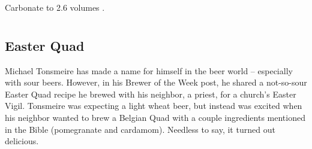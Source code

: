 \documentclass[10pt,oneside]{scrbook}
\begin{document}
\begin{methodandtiming}
 
\begin{mashsteps}
\end{mashsteps}

\begin{fermentationsteps}
\end{fermentationsteps}

\begin{directions}
Carbonate to 2.6 volumes .
\end{directions}

\end{methodandtiming}

\pagebreak

\begin{ingredientsblock}

\begin{malts}
\end{malts}

\begin{hops}
\end{hops}

\begin{yeasts}
\end{yeasts}

\end{ingredientsblock}

\part{\stylebelgiandarkstrongale}

\chapter*{Easter Quad}

\begin{aboutblock}
Michael Tonsmeire has made a name for himself in the beer world -- especially
with sour beers. However, in his Brewer of the Week post, he shared a not-so-sour
Easter Quad recipe he brewed with his neighbor, a priest, for a church's Easter Vigil.
Tonsmeire was expecting a light wheat beer, but instead was excited when his neighbor
wanted to brew a Belgian Quad with a couple ingredients mentioned in the Bible
(pomegranate and cardamom). Needless to say, it turned out delicious.
\end{aboutblock}
\end{document}

